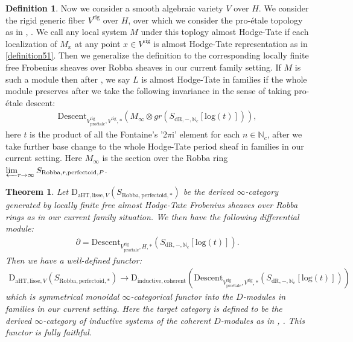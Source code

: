\documentclass[12pt]{article}
\newtheorem{theorem}{Theorem}
\theoremstyle{definition}
\newtheorem{definition}{Definition}
\begin{document}
\begin{definition}
Now we consider a smooth algebraic variety $V$ over $H$. We consider the rigid generic fiber $V^\mathrm{rig}$ over $H$, over which we consider the pro-\'etale topology as in \cite{5L}, \cite{5S1}. We call any local system $M$ under this toplogy almost Hodge-Tate if each localization of $M_x$ at any point $x\in V^\mathrm{rig}$ is almost Hodge-Tate representation as in \cref{definition51}. Then we generalize the definition to the corresponding locally finite free Frobenius sheaves over Robba sheaves in our current family setting. If $M$ is such a module then after \cite{5KLA}, \cite{5KLB} we say $L$ is almost Hodge-Tate in families if the whole module preserves after we take the following invariance in the sense of taking pro-\'etale descent:
\begin{align}
\mathrm{Descent}_{V^\mathrm{rig}_\text{pro\'etale},V^\mathrm{rig},*}(M_\infty\otimes gr(S_{\mathrm{dR},-,\mathbb{N}_c}[\mathrm{log}(t)])),
\end{align}
here $t$ is the product of all the Fontaine's '2$\pi$i' element for each $n\in \mathbb{N}_c$, after we take further base change to the whole Hodge-Tate period sheaf in families in our current setting. Here $M_\infty$ is the section over the Robba ring $\varprojlim_{r\rightarrow \infty}S_{\mathrm{Robba},r,\mathrm{perfectoid},P}$.
\end{definition}


\begin{theorem}\label{theorem3}
Let $\mathrm{D}_{\mathrm{aHT},\mathrm{lisse},V}(S_{\mathrm{Robba},\mathrm{perfectoid},*})$ be the derived $\infty$-category generated by locally finite free almost Hodge-Tate Frobenius sheaves over Robba rings as in our current family situation. We then have the following differential module:
\begin{align}
\partial=\mathrm{Descent}_{V^\mathrm{rig}_\text{pro\'etale},H,*}(S_{\mathrm{dR},-,\mathbb{N}_c}[\mathrm{log}(t)]).
\end{align}
Then we have a well-defined functor:
\begin{align}
\mathrm{D}_{\mathrm{aHT},\mathrm{lisse},V}(S_{\mathrm{Robba},\mathrm{perfectoid},*})\longrightarrow \mathrm{D}_{\mathrm{inductive},\mathrm{coherent}}(\mathrm{Descent}_{V^\mathrm{rig}_\text{pro\'etale},V^\mathrm{rig},*}(S_{\mathrm{dR},-,\mathbb{N}_c}[\mathrm{log}(t)]))
\end{align}
which is symmetrical monoidal $\infty$-categorical functor into the $D$-modules in families in our current setting. Here the target category is defined to be the derived $\infty$-category of inductive systems of the coherent $D$-modules as in \cite{5GR1}, \cite{5GR2}. This functor is fully faithful.
\end{theorem}
\end{document}

